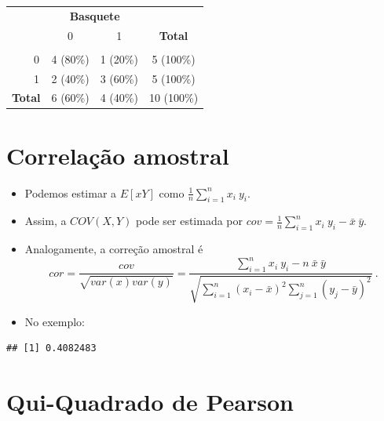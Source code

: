 \documentclass[
]{book}
\newenvironment{Shaded}{\begin{snugshade}}{\end{snugshade}}
\newcommand{\FunctionTok}[1]{\textcolor[rgb]{0.13,0.29,0.53}{\textbf{#1}}}
\newcommand{\NormalTok}[1]{#1}
\newcommand{\SpecialCharTok}[1]{\textcolor[rgb]{0.81,0.36,0.00}{\textbf{#1}}}
\begin{document}
\begin{table}[t]
\fontsize{12.0pt}{14.4pt}\selectfont
\begin{tabular*}{\linewidth}{@{\extracolsep{\fill}}lccc}
\toprule
 & \multicolumn{2}{c}{\textbf{Basquete}} &  \\ 
\cmidrule(lr){2-3}
 & 0 & 1 & \textbf{Total} \\ 
\midrule\addlinespace[2.5pt]
{\bfseries Camisa} &  &  &  \\ 
    0 & 4 (80\%) & 1 (20\%) & 5 (100\%) \\ 
    1 & 2 (40\%) & 3 (60\%) & 5 (100\%) \\ 
{\bfseries Total} & 6 (60\%) & 4 (40\%) & 10 (100\%) \\ 
\bottomrule
\end{tabular*}
\end{table}

\section{Correlação amostral}\label{correlauxe7uxe3o-amostral}

\begin{itemize}
\item
  Podemos estimar a \(E[xY]\) como \(\displaystyle \frac{1}{n}\sum_{i=1}^n x_i~y_i\).
\item
  Assim, a \(COV(X,Y)\) pode ser estimada por \(\displaystyle cov = \frac{1}{n}\sum_{i=1}^n x_i~y_i - \bar{x}~\bar{y}\).
\item
  Analogamente, a correção amostral é \[cor = \dfrac{cov}{\sqrt{var(x)var(y)}} = \dfrac{\displaystyle \sum_{i=1}^n x_i~y_i - n~\bar{x}~\bar{y}}{\displaystyle \sqrt{\sum_{i=1}^n (x_i-\bar{x})^2\sum_{j=1}^n(y_j-\bar{y})^2}}~.\]
\item
  No exemplo:
\end{itemize}

\begin{Shaded}
\end{Shaded}

\begin{verbatim}
## [1] 0.4082483
\end{verbatim}

\section{Qui-Quadrado de Pearson}\label{qui-quadrado-de-pearson}
\end{document}

